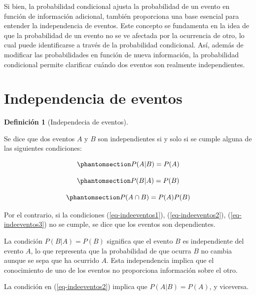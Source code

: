 \documentclass[
  us-letterpaper,
]{scrreprt}
\theoremstyle{plain}
\theoremstyle{definition}
\newtheorem{definition}{Definición}[chapter]
\theoremstyle{definition}
\theoremstyle{remark}
\begin{document}
Si bien, la probabilidad condicional ajusta la probabilidad de un evento
en función de información adicional, también proporciona una base
esencial para entender la independencia de eventos. Este concepto se
fundamenta en la idea de que la probabilidad de un evento no se ve
afectada por la ocurrencia de otro, lo cual puede identificarse a través
de la probabilidad condicional. Así, además de modificar las
probabilidades en función de nueva información, la probabilidad
condicional permite clarificar cuándo dos eventos son realmente
independientes.

\section{Independencia de eventos}\label{independencia-de-eventos}

\begin{definition}[Independecia de
eventos]\protect\hypertarget{def-indeeventos}{}\label{def-indeeventos}

Se dice que dos eventos \(A\) y \(B\) son independientes si y solo si se
cumple alguna de las siguientes condiciones:

\begin{equation}\phantomsection\label{eq-indeeventos1}{
P(A|B)= P(A)
}\end{equation}

\begin{equation}\phantomsection\label{eq-indeeventos2}{
P(B|A)= P(B)
}\end{equation}

\begin{equation}\phantomsection\label{eq-indeeventos3}{
P(A \cap B) = P(A) P(B)
}\end{equation}

\end{definition}

Por el contrario, si la condiciones (\ref{eq-indeeventos1}),
(\ref{eq-indeeventos2}), (\ref{eq-indeeventos3}) no se cumple, se dice
que los eventos son dependientes.

La condición \(P(B|A) = P(B)\) significa que el evento \(B\) es
independiente del evento \(A\), lo que representa que la probabilidad de
que ocurra \(B\) no cambia aunque se sepa que ha ocurrido \(A\). Esta
independencia implica que el conocimiento de uno de los eventos no
proporciona información sobre el otro.

La condición en (\ref{eq-indeeventos2}) implica que \(P(A|B) = P(A)\), y
viceversa.
\end{document}

